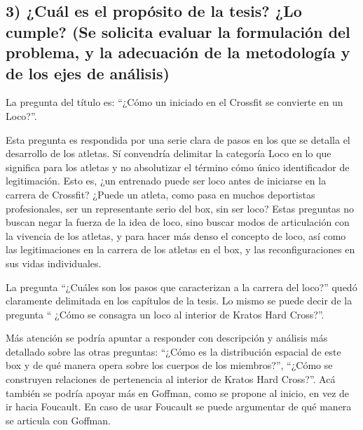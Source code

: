 \subsection*{3) ¿Cuál es el propósito de la tesis? ¿Lo cumple? 
(Se solicita evaluar la formulación del problema, y la adecuación de la metodología y de los ejes de análisis)}\label{cuuxe1l-es-el-propuxf3sito-de-la-tesis-lo-cumple-se-solicita-evaluar-la-formulaciuxf3n-del-problema-y-la-adecuaciuxf3n-de-la-metodologuxeda-y-de-los-ejes-de-anuxe1lisis}

La pregunta del título es:
``¿Cómo un iniciado en el Crossfit se convierte en un Loco?''.

Esta pregunta es respondida por una serie clara de pasos en los que se detalla el desarrollo de los atletas.
Sí convendría delimitar la categoría Loco en lo que significa para los atletas y no absolutizar el término cómo único identificador de legitimación.
Esto es, ¿un entrenado puede ser loco antes de iniciarse en la carrera de Crossfit?
¿Puede un atleta, como pasa en muchos deportistas profesionales, ser un representante serio del box, sin ser loco?
Estas preguntas no buscan negar la fuerza de la idea de loco, sino buscar modos de articulación con la vivencia de los atletas, y para hacer más denso el concepto de loco, así como las legitimaciones en la carrera de los atletas en el box, y las reconfiguraciones en sus vidas individuales.

La pregunta ``¿Cuáles son los pasos que caracterizan a la carrera del loco?'' quedó claramente delimitada en los capítulos de la tesis. Lo mismo se puede decir de la pregunta `` ¿Cómo se consagra un loco al interior de Kratos Hard Cross?''.

Más atención se podría apuntar a responder con descripción y análisis más detallado sobre las otras preguntas:
``¿Cómo es la distribución espacial de este box y de qué manera opera sobre los cuerpos de los miembros?'',
``¿Cómo se construyen relaciones de pertenencia al interior de Kratos Hard Cross?''.
Acá también se podría apoyar más en Goffman, como se propone al inicio, en vez de ir hacia Foucault.
En caso de usar Foucault se puede argumentar de qué manera se articula con Goffman.